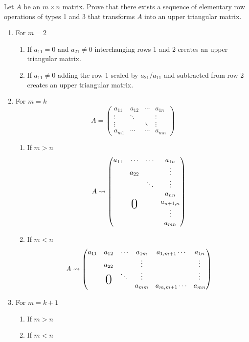 Let $A$ be an $m\times n$ matrix. Prove that there exists a sequence
of elementary row operations of types 1 and 3 that transforms $A$ into
an upper triangular matrix.
\begin{enumerate}
\item For $m = 2$
\begin{enumerate}
\item If $a_{11} = 0$ and $a_{21}\neq 0$ interchanging rows 1 and 2
  creates an upper triangular matrix.
\item If $a_{11} \neq 0$ adding the row 1 scaled by $a_{21}/a_{11}$
  and subtracted from row 2 creates an upper triangular matrix.
\end{enumerate}
\item For $m = k$ 
\begin{equation}
A = \begin{pmatrix}
a_{11} & a_{12} & \cdots & a_{1n}\\
\vdots & \ddots & & \vdots\\
\vdots & & \ddots & \vdots\\
a_{m1} & \cdots & \cdots & a_{mn}
\end{pmatrix}
\end{equation}
\begin{enumerate}
\item If $m> n$
\begin{equation}
A \leadsto \begin{pmatrix}
a_{11} & \cdots & \cdots & a_{1n}\\
& a_{22} & & \vdots\\
& & \ddots & \vdots\\
& & & a_{nn}\\
&\bigzero & & a_{n+1,n}\\
& & & \vdots\\
& & & a_{mn}
\end{pmatrix}
\end{equation}
\item If $m<n$ 
\begin{equation}
A \leadsto
\begin{pmatrix}
a_{11}& a_{12} & \cdots & a_{1m} & a_{1,m+1} \cdots & a_{1n}\\
& a_{22} & & \vdots & &  \vdots\\
& \bigzero & \ddots & \vdots & &  \vdots\\
& & & a_{mm} & a_{m,m+1} \cdots & a_{mn}\\
\end{pmatrix}
\end{equation}
\end{enumerate}
\item For $m = k + 1$
\begin{enumerate}
\item If $m > n$ 
\item If $m < n$ 
\end{enumerate}
\end{enumerate}
